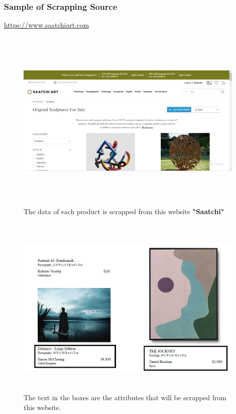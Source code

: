 \documentclass[12pt]{article}
\begin{document}
    \subsubsection{Sample of Scrapping Source}
    \color{blue}\underline{https://www.saatchiart.com}
    \newpage
    \begin{figure}[ht!]
	    \includegraphics[width = 16cm, height = 9cm]{Saatchi.PNG}
	    \renewcommand{\thefigure}{2.1}
	    \caption{The data of each product is scrapped from this website \textbf{"Saatchi"}}
    \end{figure} 
     \begin{figure}[ht!]
	    \includegraphics[width = 16cm, height = 9cm]{Attributes.png}
	    \renewcommand{\thefigure}{2.2}
	    \caption{The text in the boxes are the attributes that will be scrapped from this website.}
    \end{figure}
    \newpage
    
\end{document}
